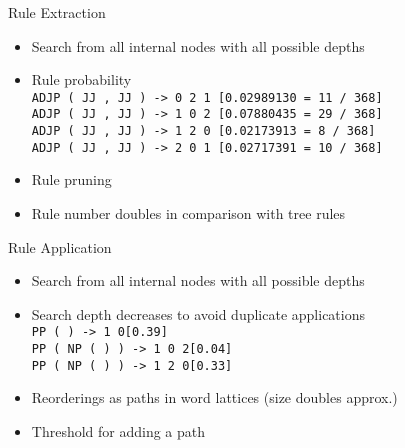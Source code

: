 \documentclass[18pt]{beamer}
\newcommand{\ul}[1]{{\color{red}{#1}}}
\begin{document}
\begin{frame}{Rule Extraction}
\begin{itemize}[<+-| alert@+>]
\item Search from all internal nodes with all possible depths
\item Rule probability
\bigskip \\
\texttt{ADJP ( JJ , JJ ) -> 0 2 1 \hphantom{xx}  [0.02989130 = \hphantom{x}11 / 368]}\\
\texttt{ADJP ( JJ , JJ ) -> 1 0 2 \hphantom{xx}  [0.07880435 =  \hphantom{x}29 / 368]}\\
\texttt{ADJP ( JJ , JJ ) -> 1 2 0 \hphantom{xx}  [0.02173913 =  \hphantom{xx}8 / 368]}\\
\texttt{ADJP ( JJ , JJ ) -> 2 0 1 \hphantom{xx}  [0.02717391 =  \hphantom{x}10 / 368]} \bigskip \\
\item Rule pruning
\item Rule number doubles in comparison with tree rules
\end{itemize}
\end{frame}

\begin{frame}{Rule Application}
\begin{itemize}[<+-| alert@+>]
\item Search from all internal nodes with all possible depths
\item Search depth decreases to avoid duplicate applications \bigskip \\
\texttt{PP ( \ul{IN$_0$} \ul{NP$_1$} ) -> 1 0\hspace{10em}[0.39]}\\
\texttt{PP ( \ul{IN$_0$} NP ( \ul{JJ$_1$} \ul{NNS$_2$} ) ) -> 1 0 2\hspace{3em}\hspace{1pt}[0.04]} \\
\texttt{PP ( \ul{IN$_0$} NP ( \ul{JJ$_1$} \ul{NNS$_2$} ) ) -> 1 2 0\hspace{3em}\hspace{1pt}[0.33]} \bigskip \\
\item Reorderings as paths in word lattices (size doubles approx.)
\item Threshold for adding a path
\end{itemize}
\end{frame}
\end{document}
